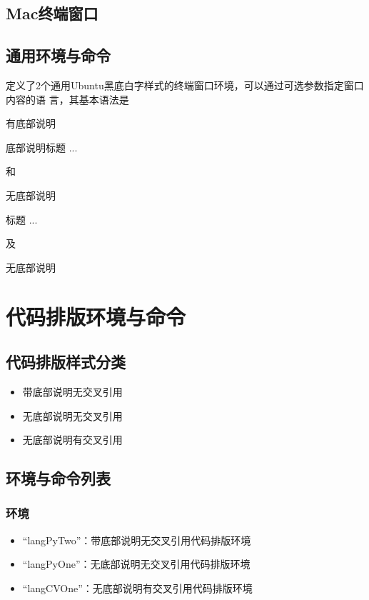 \documentclass{ctexart}
\newcommand{\qtmark}[1]{``#1''}
\begin{document}
\subsection{Mac终端窗口}

\subsection{通用环境与命令}
定义了2个通用Ubuntu黑底白字样式的终端窗口环境，可以通过可选参数指定窗口内容的语
言，其基本语法是
\begin{langPyOne}[tex]{有底部说明}
  \begin{GitExample}[代码语言]{底部说明}{标题}
     ...
  \end{GitExample} 
\end{langPyOne}
和
\begin{langPyOne}[tex]{无底部说明}
  \begin{GitExampla}[代码语言]{标题}
     ...
  \end{GitExampla} 
\end{langPyOne}
及
\begin{langPyOne}[tex]{无底部说明}
\end{langPyOne}  

\section{代码排版环境与命令}
\subsection{代码排版样式分类 }
\begin{itemize}
\item 带底部说明无交叉引用
\item 无底部说明无交叉引用
\item 无底部说明有交叉引用
\end{itemize}
\subsection{环境与命令列表}
\subsubsection{环境}
\begin{itemize}
\item \qtmark{langPyTwo}：带底部说明无交叉引用代码排版环境
\item \qtmark{langPyOne}：无底部说明无交叉引用代码排版环境
\item \qtmark{langCVOne}：无底部说明有交叉引用代码排版环境
\end{itemize}
\end{document}
